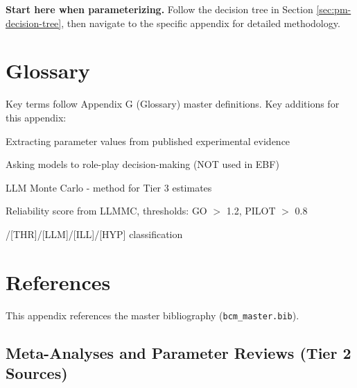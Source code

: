 \textbf{Start here when parameterizing.} Follow the decision tree in Section \ref{sec:pm-decision-tree}, then navigate to the specific appendix for detailed methodology.


\section{Glossary}
\label{sec:pm-glossary}

Key terms follow Appendix G (Glossary) master definitions. Key additions for this appendix:

\begin{description}[nosep]
    \item[Calibration:] Extracting parameter values from published experimental evidence
    \item[Simulation:] Asking models to role-play decision-making (NOT used in EBF)
    \item[LLMMC:] LLM Monte Carlo - method for Tier 3 estimates
    \item[R-Score:] Reliability score from LLMMC, thresholds: GO $>$ 1.2, PILOT $>$ 0.8
    \item[Epistemic Tag:] [EMP]/[THR]/[LLM]/[ILL]/[HYP] classification
\end{description}


\section{References}
\label{sec:pm-references}

This appendix references the master bibliography (\texttt{bcm\_master.bib}).
\nocite{bcm_master}

\subsection{Meta-Analyses and Parameter Reviews (Tier 2 Sources)}


